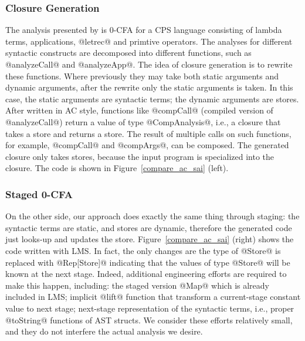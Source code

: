 \subsubsection{Closure Generation}

The analysis presented by \citeauthor{Boucher:1996:ACN:647473.727587} is 0-CFA for a CPS language consisting
of lambda terms, applications, @letrec@ and primtive operators. The analyses for different syntactic 
constructs are decomposed into different functions, such as @analyzeCall@ and @analyzeApp@.
The idea of closure generation is to rewrite these functions. Where previously they may take both static
arguments and dynamic arguments, after the rewrite only the static arguments is taken.
In this case, the static arguments are syntactic terms;
the dynamic arguments are stores.
After written in AC style, functions like @compCall@ (compiled version of @analyzeCall@) return a value of type
@CompAnalysis@, i.e., a closure that takes a store and returns a store.
The result of multiple calls on such functions, for example,
@compCall@ and @compArgs@, can be composed.
The generated closure only takes stores, because the input program
is specialized into the closure. The code is shown in Figure~\ref{compare_ac_sai} (left).

\subsubsection{Staged 0-CFA}

On the other side, our approach does exactly the same thing through staging: the syntactic terms are static, and 
stores are dynamic, therefore the generated code just looks-up and updates the store.
Figure~\ref{compare_ac_sai} (right) shows the code written with LMS. In fact, the only changes are
the type of @Store@ is replaced with @Rep[Store]@ indicating that the values of type @Store@  will be known
at the next stage. Indeed, additional engineering efforts are required to make this happen, 
including: the staged version @Map@ which is already included in LMS; implicit @lift@ function that transform a
current-stage constant value to next stage; next-stage representation of the syntactic terms, i.e., proper @toString@
functions of AST structs. We consider these efforts relatively small, and they do not interfere the actual analysis
we desire.


